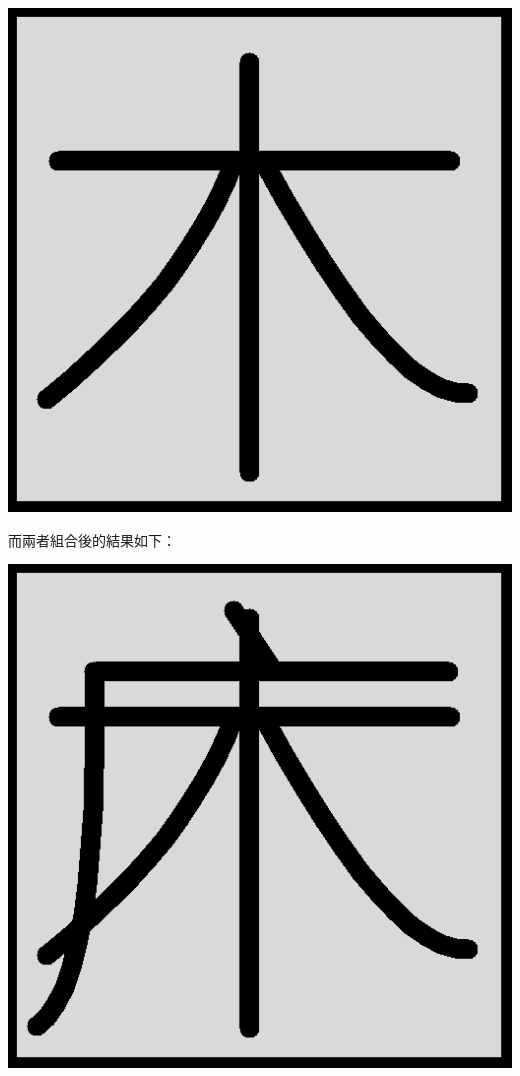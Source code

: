 \begin{center}
\includegraphics[scale=0.25]{picture/mu.png}
\end{center}

而兩者組合後的結果如下：
\begin{center}
\includegraphics[scale=0.25]{picture/chuang_bad.png}
\end{center}

